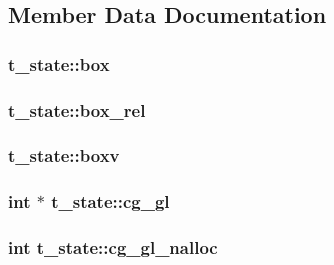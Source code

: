 \subsection{\-Member \-Data \-Documentation}
\hypertarget{structt__state_a5b04cfec0c5ca3e24af18174e68961e9}{
\subsubsection[{box}]{ {\bf t\-\_\-state\-::box}}}\label{structt__state_a5b04cfec0c5ca3e24af18174e68961e9}
\hypertarget{structt__state_ab96ac99d3d8fae263b05436261359502}{
\subsubsection[{box\-\_\-rel}]{ {\bf t\-\_\-state\-::box\-\_\-rel}}}\label{structt__state_ab96ac99d3d8fae263b05436261359502}
\hypertarget{structt__state_a032e2e984b1748f12db76af1e28aced5}{
\subsubsection[{boxv}]{ {\bf t\-\_\-state\-::boxv}}}\label{structt__state_a032e2e984b1748f12db76af1e28aced5}
\hypertarget{structt__state_a9f97055c76fc0672b97632905364cc38}{
\subsubsection[{cg\-\_\-gl}]{\setlength{\rightskip}{0pt plus 5cm}int $\ast$ {\bf t\-\_\-state\-::cg\-\_\-gl}}}\label{structt__state_a9f97055c76fc0672b97632905364cc38}
\hypertarget{structt__state_a4ba1824fb062122a7cfbd142c7e01a7d}{
\subsubsection[{cg\-\_\-gl\-\_\-nalloc}]{\setlength{\rightskip}{0pt plus 5cm}int {\bf t\-\_\-state\-::cg\-\_\-gl\-\_\-nalloc}}}\label{structt__state_a4ba1824fb062122a7cfbd142c7e01a7d}
